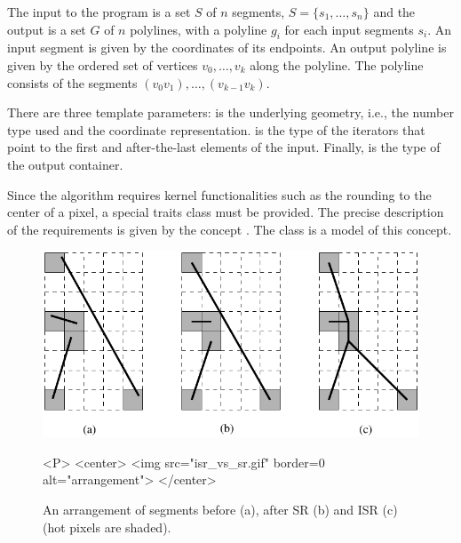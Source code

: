The input to the program is a set $S$ of $n$ segments,
$S=\{s_1,\ldots,s_n\}$ and the output is a set $G$ of $n$ polylines,
with a polyline $g_i$ for each input segments $s_i$. An input segment
is given by the coordinates of its endpoints. An output polyline is
given by the ordered set of vertices $v_0,\ldots,v_k$ along the polyline.
The polyline consists of the segments
$(v_0v_1),\ldots,(v_{k-1}v_k)$.

There are three template parameters:  is the underlying geometry,
i.e., the number type used and the coordinate representation.
 is the type of the iterators that point to the first
and after-the-last elements of the input. Finally,  is the
type of the output container.

Since the algorithm requires kernel functionalities such as the rounding to the
center of a pixel, a special traits class must be provided. The precise
description of the requirements is given by the concept
. The class  is a model of
this concept.

\begin{figure}
\begin{ccTexOnly}
\centerline{\includegraphics{Snap_rounding_2/isr_vs_sr}}
\end{ccTexOnly}

\begin{ccHtmlOnly}
<P>
<center>
  <img src="isr_vs_sr.gif"  border=0 alt="arrangement">
</center>
\end{ccHtmlOnly}

\caption{An arrangement of segments before (a), after SR (b)
and ISR (c) (hot pixels are shaded).}
\label{fig:isr_vs_sr}

\end{figure}



